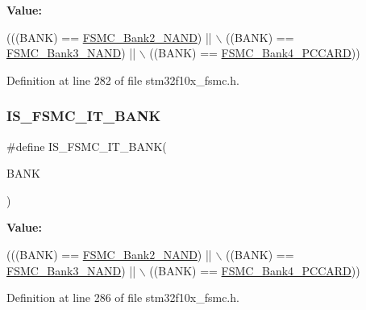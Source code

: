 {\bfseries Value\+:}
\begin{DoxyCode}
(((BANK) == \hyperlink{group___f_s_m_c___n_a_n_d___bank_ga294e7134aa329a09e56b61eec9882a27}{FSMC\_Bank2\_NAND}) || \(\backslash\)
                                    ((BANK) == \hyperlink{group___f_s_m_c___n_a_n_d___bank_gaf72def0732c026b0245d721ee371c85b}{FSMC\_Bank3\_NAND}) || \(\backslash\)
                                    ((BANK) == \hyperlink{group___f_s_m_c___p_c_c_a_r_d___bank_gad08ce7c7afc462f3d9ef085b05d42387}{FSMC\_Bank4\_PCCARD}))
\end{DoxyCode}


Definition at line 282 of file stm32f10x\+\_\+fsmc.\+h.

\mbox{\label{group___f_s_m_c___exported___constants_gaca216ea0c184b78f23df15296a10bac0}} 
\subsubsection{\texorpdfstring{I\+S\+\_\+\+F\+S\+M\+C\+\_\+\+I\+T\+\_\+\+B\+A\+NK}{IS\_FSMC\_IT\_BANK}}
{\footnotesize\ttfamily \#define I\+S\+\_\+\+F\+S\+M\+C\+\_\+\+I\+T\+\_\+\+B\+A\+NK(\begin{DoxyParamCaption}\item[{}]{B\+A\+NK }\end{DoxyParamCaption})}

{\bfseries Value\+:}
\begin{DoxyCode}
(((BANK) == \hyperlink{group___f_s_m_c___n_a_n_d___bank_ga294e7134aa329a09e56b61eec9882a27}{FSMC\_Bank2\_NAND}) || \(\backslash\)
                               ((BANK) == \hyperlink{group___f_s_m_c___n_a_n_d___bank_gaf72def0732c026b0245d721ee371c85b}{FSMC\_Bank3\_NAND}) || \(\backslash\)
                               ((BANK) == \hyperlink{group___f_s_m_c___p_c_c_a_r_d___bank_gad08ce7c7afc462f3d9ef085b05d42387}{FSMC\_Bank4\_PCCARD}))
\end{DoxyCode}


Definition at line 286 of file stm32f10x\+\_\+fsmc.\+h.

\mbox{\label{group___f_s_m_c___exported___constants_ga725bada099197f15f49dc0c5be00e19b}} 
